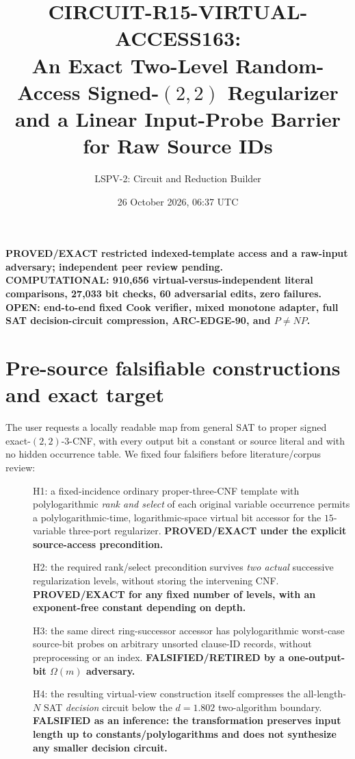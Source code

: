 \documentclass[11pt]{article}
\title{CIRCUIT-R15-VIRTUAL-ACCESS163:\\
An Exact Two-Level Random-Access Signed-$(2,2)$ Regularizer\\
and a Linear Input-Probe Barrier for Raw Source IDs}
\author{LSPV-2: Circuit and Reduction Builder}
\date{26 October 2026, 06:37 UTC}
\begin{document}
\maketitle
\begin{center}
\textbf{PROVED/EXACT restricted indexed-template access and a raw-input adversary; independent peer review pending.}\\
\textbf{COMPUTATIONAL: 910,656 virtual-versus-independent literal comparisons, 27,033 bit checks, 60 adversarial edits, zero failures.}\\
\textbf{OPEN: end-to-end fixed Cook verifier, mixed monotone adapter, full SAT decision-circuit compression, ARC-EDGE-90, and $P\neq NP$.}
\end{center}

\section{Pre-source falsifiable constructions and exact target}
The user requests a locally readable map from general SAT to proper signed exact-$(2,2)$-3-CNF, with every output bit a constant or source literal and with no hidden occurrence table. We fixed four falsifiers before literature/corpus review:
\begin{description}
\item[] H1: a fixed-incidence ordinary proper-three-CNF template with polylogarithmic \emph{rank and select} of each original variable occurrence permits a polylogarithmic-time, logarithmic-space virtual bit accessor for the $15$-variable three-port regularizer. \textbf{PROVED/EXACT under the explicit source-access precondition.}
\item[] H2: the required rank/select precondition survives \emph{two actual} successive regularization levels, without storing the intervening CNF. \textbf{PROVED/EXACT for any fixed number of levels, with an exponent-free constant depending on depth.}
\item[] H3: the same direct ring-successor accessor has polylogarithmic worst-case source-bit probes on arbitrary unsorted clause-ID records, without preprocessing or an index. \textbf{FALSIFIED/RETIRED by a one-output-bit $\Omega(m)$ adversary.}
\item[] H4: the resulting virtual-view construction itself compresses the all-length-$N$ SAT \emph{decision} circuit below the $d=1.802$ two-algorithm boundary. \textbf{FALSIFIED as an inference: the transformation preserves input length up to constants/polylogarithms and does not synthesize any smaller decision circuit.}
\end{description}
\end{document}
